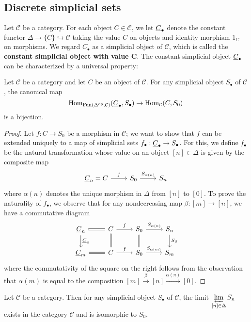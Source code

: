 \subsection{Discrete simplicial sets}
Let $\mathcal{C}$ be a category. For each object $C\in\mathcal{C}$, we let $\uline{C}_\bullet$ denote the constant functor $\Delta\to\{C\}\hookrightarrow\mathcal{C}$ taking the value $C$ on objects and identity morphism $1_C$ on morphisms. We regard $C_\bullet$ as a simplicial object of $\mathcal{C}$, which is called the \textbf{constant simplicial object with value $\bm{C}$}. The constant simplicial object $\uline{C}_\bullet$ can be characterized by a universal property:
\begin{proposition}\label{simplicial set constant universal prop}
Let $\mathcal{C}$ be a category and let $C$ be an object of $\mathcal{C}$. For any simplicial object $S_\bullet$ of $\mathcal{C}$, the canonical map
\[\Hom_{\Fun(\Delta^{\op},\mathcal{C})}(\uline{C}_\bullet,S_\bullet)\to\Hom_{\mathcal{C}}(C,S_0)\]
is a bijection.
\end{proposition}
\begin{proof}
Let $f:C\to S_0$ be a morphism in $\mathcal{C}$; we want to show that $f$ can be extended uniquely to a map of simplicial sets $f_\bullet:\uline{C}_\bullet\to S_\bullet$. For this, we define $f_\bullet$ be the natural transformation whose value on an object $[n]\in\Delta$ is given by the composite map
\[\begin{tikzcd}
\uline{C}_n=C\ar[r,"f"]&S_0\ar[r,"S_{\alpha(n)}"]&S_n
\end{tikzcd}\]
where $\alpha(n)$ denotes the unique morphism in $\Delta$ from $[n]$ to $[0]$. To prove the naturality of $f_\bullet$, we observe that for any nondecreasing map $\beta:[m]\to[n]$, we have a commutative diagram
\[\begin{tikzcd}
\uline{C}_n\ar[r,equal]\ar[d,"\uline{C}_\beta"]&C\ar[r,"f"]\ar[d,equal]&S_0\ar[r,"S_{\alpha(n)}"]\ar[d,equal]&S_n\ar[d,"S_\beta"]\\
\uline{C}_m\ar[r,equal]&C\ar[r,"f"]&S_0\ar[r,"S_{\alpha(m)}"]&S_m
\end{tikzcd}\]
where the commutativity of the square on the right follows from the observation that $\alpha(m)$ is equal to the composition $[m]\stackrel{\beta}{\to}[n]\stackrel{\alpha(n)}{\to}[0]$.
\end{proof}
\begin{corollary}\label{simplicial set limit of S_n isomorphic to S_0}
Let $\mathcal{C}$ be a category. Then for any simplicial object $S_\bullet$ of $\mathcal{C}$, the limit $\varprojlim\limits_{[n]\in\Delta}S_n$ exists in the category $\mathcal{C}$ and is isomorphic to $S_0$.
\end{corollary}
